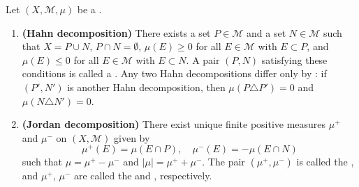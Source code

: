 \begin{theorem}
\label{theorem:hahn_decomposition_and_jordan_decomposition}
Let $(X, \mathcal{M}, \mu)$ be a .

\begin{enumerate}
    \item \textbf{(Hahn decomposition)} There exists a set $P \in \mathcal{M}$ and a set $N \in \mathcal{M}$ such that $X = P \cup N$, $P \cap N = \emptyset$, $\mu(E) \geq 0$ for all $E \in \mathcal{M}$ with $E \subset P$, and $\mu(E) \leq 0$ for all $E \in \mathcal{M}$ with $E \subset N$. A pair $(P, N)$ satisfying these conditions is called a . Any two Hahn decompositions differ only by : if $(P', N')$ is another Hahn decomposition, then $\mu(P \triangle P') = 0$ and $\mu(N \triangle N') = 0$.

    \item \textbf{(Jordan decomposition)} There exist unique finite positive measures $\mu^+$ and $\mu^-$ on $(X, \mathcal{M})$ given by
    $$\mu^+(E) = \mu(E \cap P), \quad \mu^-(E) = -\mu(E \cap N)$$
    such that $\mu = \mu^+ - \mu^-$ and $|\mu| = \mu^+ + \mu^-$. The pair $(\mu^+, \mu^-)$ is called the , and $\mu^+$, $\mu^-$ are called the  and , respectively.
\end{enumerate}
\end{theorem}

